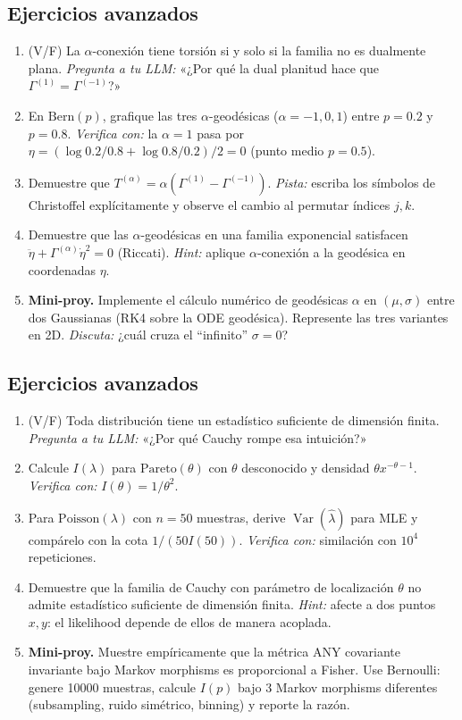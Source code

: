 \subsection*{Ejercicios avanzados}
\begin{enumerate}[resume]
	\item[$\star$] (V/F) La $\alpha$-conexión tiene torsión si y solo si la familia no es dualmente plana. \textit{Pregunta a tu LLM:} «¿Por qué la dual planitud hace que $\Gamma^{(1)}=\Gamma^{(-1)}$?»
	\item[$\star\star$] En $\mathrm{Bern}(p)$, grafique las tres $\alpha$-geodésicas ($\alpha=-1,0,1$) entre $p=0.2$ y $p=0.8$. \textit{Verifica con:} la $\alpha=1$ pasa por $\eta=(\log 0.2/0.8+\log 0.8/0.2)/2=0$ (punto medio $p=0.5$).
	\item[$\star\star\star$] Demuestre que $T^{(\alpha)}=\alpha(\Gamma^{(1)}-\Gamma^{(-1)})$. \textit{Pista:} escriba los símbolos de Christoffel explícitamente y observe el cambio al permutar índices $j,k$.
	\item[$\star\star\star$] Demuestre que las $\alpha$-geodésicas en una familia exponencial satisfacen $\ddot\eta+\Gamma^{(\alpha)}\dot\eta^2=0$ (Riccati). \textit{Hint:} aplique $\alpha$-conexión a la geodésica en coordenadas $\eta$.
	\item[$\star\star\star\star$] \textbf{Mini-proy.} Implemente el cálculo numérico de geodésicas $\alpha$ en $(\mu,\sigma)$ entre dos Gaussianas (RK4 sobre la ODE geodésica). Represente las tres variantes en 2D. \textit{Discuta:} ¿cuál cruza el ``infinito'' $\sigma=0$?
\end{enumerate}

\subsection*{Ejercicios avanzados}
\begin{enumerate}[resume]
	\item[$\star$] (V/F) Toda distribución tiene un estadístico suficiente de dimensión finita. \textit{Pregunta a tu LLM:} «¿Por qué Cauchy rompe esa intuición?»
	\item[$\star\star$] Calcule $I(\lambda)$ para $\mathrm{Pareto}(\theta)$ con $\theta$ desconocido y densidad $\theta x^{-\theta-1}$. \textit{Verifica con:} $I(\theta)=1/\theta^2$.
	\item[$\star\star\star$] Para $\mathrm{Poisson}(\lambda)$ con $n=50$ muestras, derive $\operatorname{Var}(\hat\lambda)$ para MLE y compárelo con la cota $1/(50 I(50))$. \textit{Verifica con:} similación con $10^4$ repeticiones.
	\item[$\star\star\star$] Demuestre que la familia de Cauchy con parámetro de localización $\theta$ no admite estadístico suficiente de dimensión finita. \textit{Hint:} afecte a dos puntos $x,y$: el likelihood depende de ellos de manera acoplada.
	\item[$\star\star\star\star$] \textbf{Mini-proy.} Muestre empíricamente que la métrica ANY covariante invariante bajo Markov morphisms es proporcional a Fisher. Use Bernoulli: genere 10000 muestras, calcule $I(p)$ bajo 3 Markov morphisms diferentes (subsampling, ruido simétrico, binning) y reporte la razón.
\end{enumerate}

